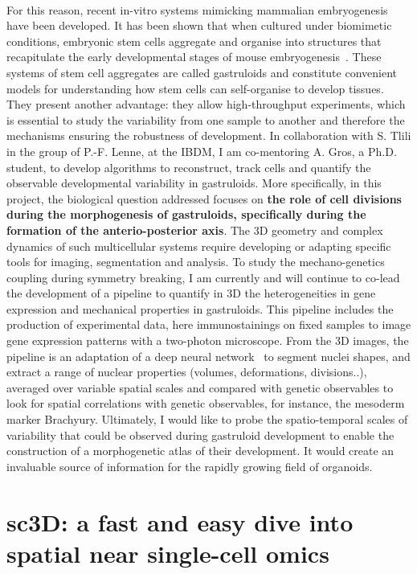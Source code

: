 \paragraph{}For this reason, recent in-vitro systems mimicking mammalian embryogenesis have been developed.
It has been shown that when cultured under biomimetic conditions, embryonic stem cells aggregate and organise into structures that recapitulate the early developmental stages of mouse embryogenesis~\cite{vandenBrink2014}.
These systems of stem cell aggregates are called gastruloids and constitute convenient models for understanding how stem cells can self-organise to develop tissues.
They present another advantage: they allow high-throughput experiments, which is essential to study the variability from one sample to another and therefore the mechanisms ensuring the robustness of development.
In collaboration with S. Tlili in the group of P.-F. Lenne, at the IBDM, I am co-mentoring A. Gros, a Ph.D. student, to develop algorithms to reconstruct, track cells and quantify the observable developmental variability in gastruloids.
More specifically, in this project, the biological question addressed focuses on \textbf{the role of cell divisions during the morphogenesis of gastruloids, specifically during the formation of the anterio-posterior axis}.
The 3D geometry and complex dynamics of such multicellular systems require developing or adapting specific tools for imaging, segmentation and analysis.
To study the mechano-genetics coupling during symmetry breaking, I am currently and will continue to co-lead the development of a pipeline to quantify in 3D the heterogeneities in gene expression and mechanical properties in gastruloids.
This pipeline includes the production of experimental data, here immunostainings on fixed samples to image gene expression patterns with a two-photon microscope.
From the 3D images, the pipeline is an adaptation of a deep neural network~\cite{Weigert2020} to segment nuclei shapes, and extract a range of nuclear properties (volumes, deformations, divisions..), averaged over variable spatial scales and compared with genetic observables to look for spatial correlations with genetic observables, for instance, the mesoderm marker Brachyury.
Ultimately, I would like to probe the spatio-temporal scales of variability that could be observed during gastruloid development to enable the construction of a morphogenetic atlas of their development.
It would create an invaluable source of information for the rapidly growing field of organoids.
\section{sc3D: a fast and easy dive into spatial near single-cell omics}\label{sec:sc3D}
